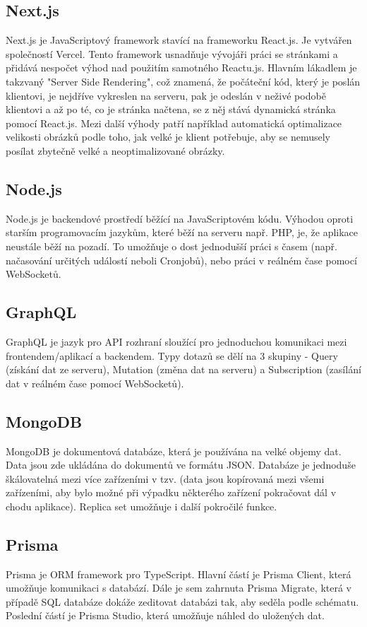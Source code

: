 \subsection{Next.js}
Next.js je JavaScriptový framework stavící na frameworku React.js. Je vytvářen společností Vercel. Tento framework usnadňuje vývojáři práci se stránkami a přidává nespočet výhod nad použitím samotného Reactu.js. Hlavním lákadlem je takzvaný "Server Side Rendering", což znamená, že počáteční kód, který je poslán klientovi, je nejdříve vykreslen na serveru, pak je odeslán v neživé podobě klientovi a až po té, co je stránka načtena, se z něj stává dynamická stránka pomocí React.js. Mezi další výhody patří například automatická optimalizace velikosti obrázků podle toho, jak velké je klient potřebuje, aby se nemusely posílat zbytečně velké a neoptimalizované obrázky.

\subsection{Node.js}
Node.js je backendové prostředí běžící na JavaScriptovém kódu. Výhodou oproti starším programovacím jazykům, které běží na serveru např. PHP, je, že aplikace neustále běží na pozadí. To umožňuje o dost jednodušší práci s časem (např. načasování určitých událostí neboli Cronjobů), nebo práci v reálném čase pomocí WebSocketů.

\subsection{GraphQL}
GraphQL je jazyk pro API rozhraní sloužící pro jednoduchou komunikaci mezi frontendem/aplikací a backendem. Typy dotazů se dělí na 3 skupiny - Query (získání dat ze serveru), Mutation (změna dat na serveru) a Subscription (zasílání dat v reálném čase pomocí WebSocketů).

\subsection{MongoDB}
MongoDB je dokumentová databáze, která je používána na velké objemy dat. Data jsou zde ukládána do dokumentů ve formátu JSON. Databáze je jednoduše škálovatelná mezi více zařízeními v tzv.  (data jsou kopírovaná mezi všemi zařízeními, aby bylo možné při výpadku některého zařízení pokračovat dál v chodu aplikace). Replica set umožňuje i další pokročilé funkce.

\subsection{Prisma}
Prisma je ORM framework pro TypeScript. Hlavní částí je Prisma Client, která umožňuje komunikaci s databází. Dále je sem zahrnuta Prisma Migrate, která v případě SQL databáze dokáže zeditovat databázi tak, aby seděla podle schématu. Poslední částí je Prisma Studio, která umožňuje náhled do uložených dat.\cite{Prisma}

